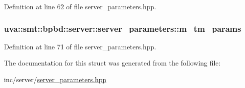 Definition at line 62 of file server\+\_\+parameters.\+hpp.

\hypertarget{structuva_1_1smt_1_1bpbd_1_1server_1_1server__parameters_ac6d1ed3b9b3127ed1bc03adf3ea2b882}{}
\subsubsection[{m\+\_\+tm\+\_\+params}]{ uva\+::smt\+::bpbd\+::server\+::server\+\_\+parameters\+::m\+\_\+tm\+\_\+params}\label{structuva_1_1smt_1_1bpbd_1_1server_1_1server__parameters_ac6d1ed3b9b3127ed1bc03adf3ea2b882}


Definition at line 71 of file server\+\_\+parameters.\+hpp.



The documentation for this struct was generated from the following file\+:\begin{DoxyCompactItemize}
\item 
inc/server/\hyperlink{server__parameters_8hpp}{server\+\_\+parameters.\+hpp}\end{DoxyCompactItemize}

